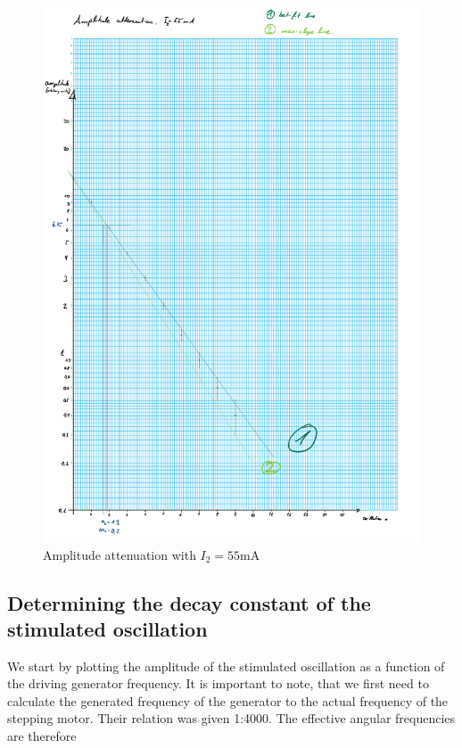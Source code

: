 \documentclass{article}
\begin{document}
\begin{figure} [p]
    \centering
    \includegraphics[width=\textwidth]{graphics/13-dia2.pdf}
    \caption{Amplitude attenuation with $I_2 = 55$mA}
    \label{fig:2}
\end{figure}

\newpage

\subsection{Determining the decay constant of the stimulated oscillation}

We start by plotting the amplitude of the stimulated oscillation as a function of the driving generator frequency. It is important to note, that we first need to calculate the generated frequency of the generator to the actual frequency of the stepping motor. Their relation was given 1:4000. The effective angular frequencies are therefore
\end{document}
